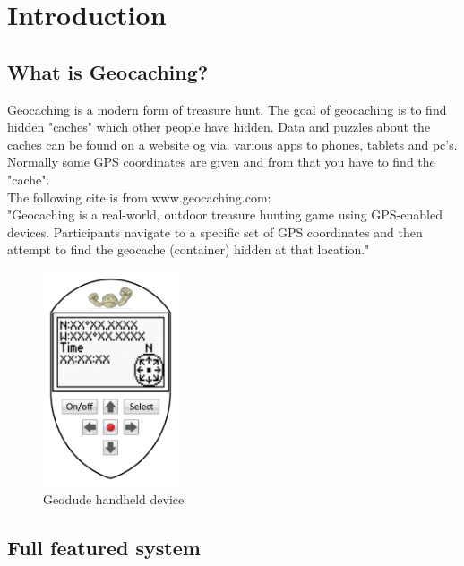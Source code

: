 \chapter{Introduction}
\label{Intro}

\section{What is Geocaching?}
Geocaching is a modern form of treasure hunt. The goal of geocaching is to find hidden "caches" which other people have hidden. Data and puzzles about the caches can be found on a website og via. various apps to phones, tablets and pc's. Normally some GPS coordinates are given and from that you have to find the "cache".\\
The following cite is from www.geocaching.com:\\
"Geocaching is a real-world, outdoor treasure hunting game using GPS-enabled devices. Participants navigate to a specific set of GPS coordinates and then attempt to find the geocache (container) hidden at that location."

\begin{figure}
\vspace{-30pt}
\begin{center}
\includegraphics[width=4cm]{billeder/geodude}
\end{center}
\vspace{-20pt}
\caption{Geodude handheld device}
\vspace{-20pt}
\end{figure}

\section{Full featured system}

